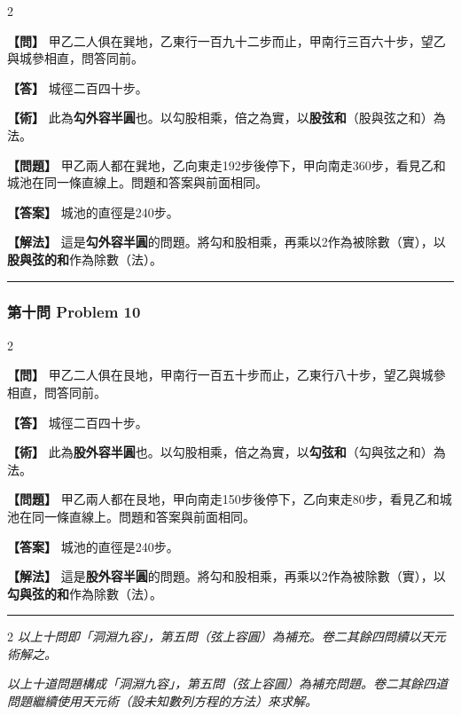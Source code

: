 \documentclass[11pt,a4paper]{article}
\newcommand{\wen}[1]{\par\noindent\textbf{\color{problemcolor}【問】} #1\par}
\newcommand{\da}[1]{\par\noindent\textbf{\color{problemcolor}【答】} #1\par}
\newcommand{\shu}[1]{\par\noindent\textbf{\color{problemcolor}【術】} #1\par}
\newcommand{\wenm}[1]{\par\noindent\textbf{\color{problemcolor}【問題】} #1\par}
\newcommand{\dam}[1]{\par\noindent\textbf{\color{problemcolor}【答案】} #1\par}
\newcommand{\shum}[1]{\par\noindent\textbf{\color{problemcolor}【解法】} #1\par}
\begin{document}
\begin{paracol}{2}
\wen{甲乙二人俱在巽地，乙東行一百九十二步而止，甲南行三百六十步，望乙與城參相直，問答同前。}

\da{城徑二百四十步。}

\shu{此為\textbf{勾外容半圓}也。以勾股相乘，倍之為實，以\textbf{股弦和}（股與弦之和）為法。}

\switchcolumn
\wenm{甲乙兩人都在巽地，乙向東走192步後停下，甲向南走360步，看見乙和城池在同一條直線上。問題和答案與前面相同。}

\dam{城池的直徑是240步。}

\shum{這是\textbf{勾外容半圓}的問題。將勾和股相乘，再乘以2作為被除數（實），以\textbf{股與弦的和}作為除數（法）。}
\end{paracol}

\vspace{0.5cm}
\noindent\textcolor{rulecolor}{\rule{\textwidth}{0.4pt}}

\subsubsection*{第十問 \quad Problem 10}

\begin{paracol}{2}
\wen{甲乙二人俱在艮地，甲南行一百五十步而止，乙東行八十步，望乙與城參相直，問答同前。}

\da{城徑二百四十步。}

\shu{此為\textbf{股外容半圓}也。以勾股相乘，倍之為實，以\textbf{勾弦和}（勾與弦之和）為法。}

\switchcolumn
\wenm{甲乙兩人都在艮地，甲向南走150步後停下，乙向東走80步，看見乙和城池在同一條直線上。問題和答案與前面相同。}

\dam{城池的直徑是240步。}

\shum{這是\textbf{股外容半圓}的問題。將勾和股相乘，再乘以2作為被除數（實），以\textbf{勾與弦的和}作為除數（法）。}
\end{paracol}

\vspace{0.5cm}
\noindent\textcolor{rulecolor}{\rule{\textwidth}{0.4pt}}

\begin{paracol}{2}
\textit{以上十問即「洞淵九容」，第五問（弦上容圓）為補充。卷二其餘四問續以天元術解之。}

\switchcolumn
\textit{以上十道問題構成「洞淵九容」，第五問（弦上容圓）為補充問題。卷二其餘四道問題繼續使用天元術（設未知數列方程的方法）來求解。}
\end{paracol}
\end{document}
